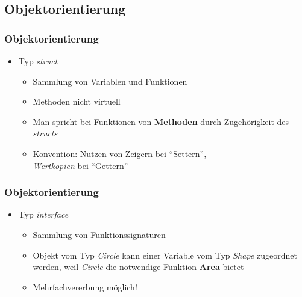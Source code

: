 \documentclass{beamer}
\begin{document}

\subsection{Objektorientierung}
\begin{frame}[fragile]
\frametitle{Objektorientierung}

\begin{itemize}
\item Typ \textit{struct}
\begin{itemize}
\setlength{\itemsep}{24pt}
\item Sammlung von Variablen und Funktionen
\item Methoden nicht virtuell
\item Man spricht bei Funktionen von \textbf{Methoden} durch Zugeh\"origkeit des \textit{structs}
\item Konvention: Nutzen von Zeigern bei ``Settern'',\\ \textit{Wertkopien} bei ``Gettern''
\end{itemize}
\end{itemize}

\end{frame}

\begin{frame}
\frametitle{Objektorientierung}

\begin{itemize}
\item Typ \textit{interface}
\begin{itemize}
\setlength{\itemsep}{24pt}
\item Sammlung von Funktionssignaturen
\item Objekt vom Typ \textit{Circle} kann einer Variable vom Typ \textit{Shape} zugeordnet werden, weil \textit{Circle} die notwendige Funktion \textbf{Area} bietet
\item Mehrfachvererbung m\"oglich!
\end{itemize}
\end{itemize}

\end{frame}
\end{document}
